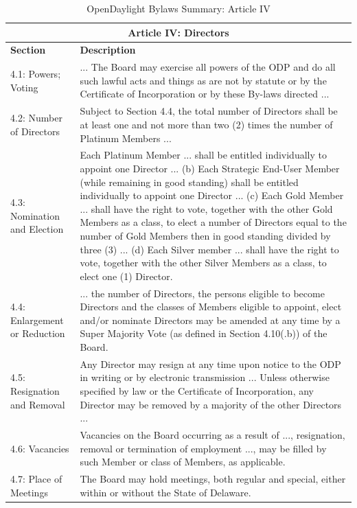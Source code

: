 \documentclass[a4paper, 12pt]{book}
\begin{document}
{\begin{table}[H]
  \begin{center}
    \begin{tabular}{ | p{4cm} | p{11cm} | }
    \toprule
    \multicolumn {2}{|c|}{\textbf{Article IV: Directors}} \\
    \hline
    \textbf{Section} & \textbf{Description} \\
    \hline
    4.1: Powers; Voting & ... The Board may exercise all powers of the ODP and do all such lawful acts and things as are not by statute or by the Certificate of Incorporation or by these By-laws directed ...\\
    \hline
    4.2: Number of Directors & Subject to Section 4.4, the total number of Directors shall be at least one and not more than two (2) times the number of Platinum Members ...\\
    \hline
    4.3:  Nomination and Election & Each Platinum Member ... shall be entitled individually to appoint one Director ... (b) Each Strategic End-User Member (while remaining in good standing) shall be entitled individually to appoint one Director ... (c) Each Gold Member ... shall have the right to vote, together with the other Gold Members as a class, to elect a number of Directors equal to the number of Gold Members then in good standing divided by three (3) ... (d) Each Silver member ... shall have the right to vote, together with the other Silver Members as a class, to elect one (1) Director. \\
    \hline
    4.4: Enlargement or Reduction & ... the number of Directors, the persons eligible to become Directors and the classes of Members eligible to appoint, elect and/or nominate Directors may be amended at any time by a Super Majority Vote (as defined in Section 4.10(.b)) of the Board.\\
    \hline
    4.5: Resignation and Removal & Any Director may resign at any time upon notice to the ODP in writing or by electronic transmission ... Unless otherwise specified by law or the Certificate of Incorporation, any Director may be removed by a majority of the other Directors ...\\
    \hline
    4.6: Vacancies & Vacancies on the Board occurring as a result of ..., resignation, removal or termination of employment ..., may be filled by such Member or class of Members, as applicable. \\
    \hline
    4.7: Place of Meetings & The Board may hold meetings, both regular and special, either within or without the State of Delaware. \\
    \bottomrule
    \end{tabular}
    \caption{OpenDaylight Bylaws Summary: Article IV}
    \label{tab:odlbylaws-art04}
  \end{center}
\end{table}

}
\end{document}
